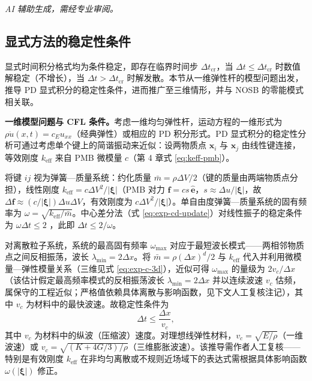 \emph{AI 辅助生成，需经专业审阅。}

\subsection{显式方法的稳定性条件}\label{sec:disc-stability}

显式时间积分格式均为条件稳定，即存在临界时间步 $\Delta t_{\text{cr}}$，当 $\Delta t\le\Delta t_{\text{cr}}$ 时数值解稳定（不增长），当 $\Delta t>\Delta t_{\text{cr}}$ 时解发散。本节从一维弹性杆的模型问题出发，推导 PD 显式积分的稳定性条件，进而推广至三维情形，并与 NOSB 的零能模式相关联。

\textbf{一维模型问题与 CFL 条件。}考虑一维均匀弹性杆，运动方程的一维形式为 $\rho\ddot{u}(x,t)=c_E u_{xx}$（经典弹性）或相应的 PD 积分形式。PD 显式积分的稳定性分析可通过考虑单个键上的简谐振动来近似：设两物质点 $\mathbf{x}_i$ 与 $\mathbf{x}_j$ 由线性键连接，等效刚度 $k_{\text{eff}}$ 来自 PMB 微模量 $c$（第 4 章式 \eqref{eq:keff-pmb}）。

将键 $ij$ 视为弹簧—质量系统：约化质量 $\bar{m}=\rho\Delta V/2$（键的质量由两端物质点分担），线性刚度 $k_{\text{eff}}=c\Delta V^2/|\boldsymbol{\xi}|$（PMB 对力 $\mathbf{f}=c s\,\hat{\mathbf{e}}$，$s\approx\Delta u/|\boldsymbol{\xi}|$，故 $\Delta\mathbf{f}\approx(c/|\boldsymbol{\xi}|)\Delta u\Delta V$，有效刚度为 $c\Delta V^2/|\boldsymbol{\xi}|$）。单自由度弹簧—质量系统的固有频率为 $\omega=\sqrt{k_{\text{eff}}/\bar{m}}$。中心差分法（式 \eqref{eq:exp-cd-update}）对线性振子的稳定条件为 $\omega\Delta t\le2$ \cite{BelytschkoLiuMoran2000}，此即 $\Delta t\le 2/\omega$。

对离散粒子系统，系统的最高固有频率 $\omega_{\max}$ 对应于最短波长模式——两相邻物质点之间反相振荡，波长 $\lambda_{\min}=2\Delta x$。将 $\bar{m}=\rho(\Delta x)^d/2$ 与 $k_{\text{eff}}$ 代入并利用微模量—弹性模量关系（三维见式 \eqref{eq:exp-c-3d}），近似可得 $\omega_{\max}$ 的量级为 $2v_c/\Delta x$（该估计假定最高频率模式的反相振荡波长 $\lambda_{\min}=2\Delta x$ 并以连续波速 $v_c$ 估频，属保守的工程近似；严格值依赖具体离散与影响函数，见下文人工复核注记），其中 $v_c$ 为材料中的最快波速。故稳定性条件为
\begin{equation}
  \Delta t \le \frac{\Delta x}{v_c},
  \label{eq:exp-cfl-1d}
\end{equation}
其中 $v_c$ 为材料中的纵波（压缩波）速度。对理想线弹性材料，$v_c=\sqrt{E/\rho}$（一维波速）或 $v_c=\sqrt{(K+4G/3)/\rho}$（三维膨胀波速）。该推导需作者人工复核——特别是有效刚度 $k_{\text{eff}}$ 在非均匀离散或不规则近场域下的表达式需根据具体影响函数 $\omega(|\boldsymbol{\xi}|)$ 修正。

